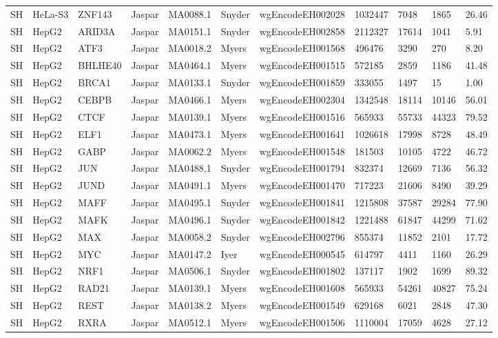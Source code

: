 {\begin{longtable}{p{0.2cm}p{1.1cm}p{1.0cm}p{1.0cm}p{1.0cm}p{1.0cm}p{2.3cm}p{1.0cm}p{0.8cm}p{0.8cm}p{0.8cm}}
SH & HeLa-S3 & ZNF143 & Jaspar & MA0088.1 & Snyder & wgEncodeEH002028 & 1032447 & 7048 & 1865 & 26.46\\
SH & HepG2 & ARID3A & Jaspar & MA0151.1 & Snyder & wgEncodeEH002858 & 2112327 & 17614 & 1041 & 5.91\\
SH & HepG2 & ATF3 & Jaspar & MA0018.2 & Myers & wgEncodeEH001568 & 496476 & 3290 & 270 & 8.20\\
SH & HepG2 & BHLHE40 & Jaspar & MA0464.1 & Myers & wgEncodeEH001515 & 572185 & 2859 & 1186 & 41.48\\
SH & HepG2 & BRCA1 & Jaspar & MA0133.1 & Snyder & wgEncodeEH001859 & 333055 & 1497 & 15 & 1.00\\
SH & HepG2 & CEBPB & Jaspar & MA0466.1 & Myers & wgEncodeEH002304 & 1342548 & 18114 & 10146 & 56.01\\
SH & HepG2 & CTCF & Jaspar & MA0139.1 & Myers & wgEncodeEH001516 & 565933 & 55733 & 44323 & 79.52\\
SH & HepG2 & ELF1 & Jaspar & MA0473.1 & Myers & wgEncodeEH001641 & 1026618 & 17998 & 8728 & 48.49\\
SH & HepG2 & GABP & Jaspar & MA0062.2 & Myers & wgEncodeEH001548 & 181503 & 10105 & 4722 & 46.72\\
SH & HepG2 & JUN & Jaspar & MA0488.1 & Snyder & wgEncodeEH001794 & 832374 & 12669 & 7136 & 56.32\\
SH & HepG2 & JUND & Jaspar & MA0491.1 & Myers & wgEncodeEH001470 & 717223 & 21606 & 8490 & 39.29\\
SH & HepG2 & MAFF & Jaspar & MA0495.1 & Snyder & wgEncodeEH001841 & 1215808 & 37587 & 29284 & 77.90\\
SH & HepG2 & MAFK & Jaspar & MA0496.1 & Snyder & wgEncodeEH001842 & 1221488 & 61847 & 44299 & 71.62\\
SH & HepG2 & MAX & Jaspar & MA0058.2 & Snyder & wgEncodeEH002796 & 855374 & 11852 & 2101 & 17.72\\
SH & HepG2 & MYC & Jaspar & MA0147.2 & Iyer & wgEncodeEH000545 & 614797 & 4411 & 1160 & 26.29\\
SH & HepG2 & NRF1 & Jaspar & MA0506.1 & Snyder & wgEncodeEH001802 & 137117 & 1902 & 1699 & 89.32\\
SH & HepG2 & RAD21 & Jaspar & MA0139.1 & Myers & wgEncodeEH001608 & 565933 & 54261 & 40827 & 75.24\\
SH & HepG2 & REST & Jaspar & MA0138.2 & Myers & wgEncodeEH001549 & 629168 & 6021 & 2848 & 47.30\\
SH & HepG2 & RXRA & Jaspar & MA0512.1 & Myers & wgEncodeEH001506 & 1110004 & 17059 & 4628 & 27.12\\

\end{longtable}}
